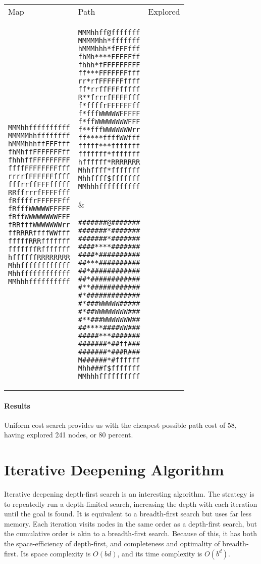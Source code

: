 \documentclass[12pt, article]{scrartcl}
\begin{document}
\begin{tabular}{p{2in} p{2in} p{2in}}
Map & Path & Explored \\

\begin{verbatim}
MMMhhffffffffff
MMMMMhhffffffff
hMMMhhhffFFFfff
fhMhffFFFFFFFff
fhhhffFFFFFFFFF
ffffFFFFFFFFfff
rrrrfFFFFFFffff
fffrrffFFFfffff
RRffrrrfFFFFfff
fRffffrFFFFFFff
fRfffWWWWWFFFFF
fRffWWWWWWWWFFF
fRRfffWWWWWWWrr
ffRRRRffffWWfff
fffffRRRfffffff
fffffffRfffffff
hffffffRRRRRRRR
Mhhffffffffffff
Mhhffffffffffff
MMhhhffffffffff
\end{verbatim}
&
\begin{verbatim}
MMMhhff@fffffff
MMMMMhh*fffffff
hMMMhhh*fFFFfff
fhMh****FFFFFff
fhhh*fFFFFFFFFF
ff***FFFFFFFfff
rr*rfFFFFFFffff
ff*rrffFFFfffff
R**frrrfFFFFfff
f*ffffrFFFFFFff
f*fffWWWWWFFFFF
f*ffWWWWWWWWFFF
f**fffWWWWWWWrr
ff****ffffWWfff
fffff***fffffff
fffffff*fffffff
hffffff*RRRRRRR
Mhhffff*fffffff
Mhhffff$fffffff
MMhhhffffffffff
\end{verbatim}
&
\begin{verbatim}
#######@#######
#######*#######
#######*#######
####****#######
####*##########
##***##########
##*############
##*############
#**############
#*#############
#*###WWWWW#####
#*##WWWWWWWW###
#**###WWWWWWW##
##****####WW###
#####***#######
#######*##ff###
#######*###R###
M######*#ffffff
Mhh###f$fffffff
MMhhhffffffffff
\end{verbatim}
\end{tabular}
\paragraph{Results}
Uniform cost search provides us with the cheapest possible path cost of 58, having explored 241 nodes, or 80 percent. \\

\section{Iterative Deepening Algorithm}
Iterative deepening depth-first search is an interesting algorithm. The strategy is to repeatedly run a depth-limited search, increasing the depth with each iteration until the goal is found. It is equivalent to a breadth-first search but uses far less memory. Each iteration visits nodes in the same order as a depth-first search, but the cumulative order is akin to a breadth-first search. Because of this, it has both the space-efficiency of depth-first, and completeness and optimality of breadth-first. Its space complexity is $O(bd)$, and its time complexity is $O(b^d)$. \\
\end{document}

